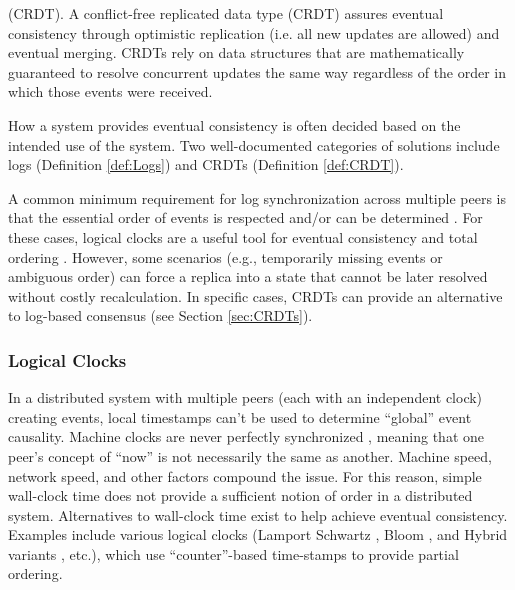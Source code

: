 \documentclass{textile}
\begin{document}
\begin{definition}
  (CRDT). A conflict-free replicated data type (CRDT) assures eventual consistency through optimistic replication (i.e. all new updates are allowed) and eventual merging. CRDTs rely on data structures that are mathematically guaranteed to resolve concurrent updates the same way regardless of the order in which those events were received.
\end{definition} \label{def:CRDT}

How a system provides eventual consistency is often decided based on the intended use of the system. Two well-documented categories of solutions include logs (Definition  \ref{def:Logs}) and CRDTs (Definition  \ref{def:CRDT}).

A common minimum requirement for log synchronization across multiple peers is that the essential order of events is respected and/or can be determined \cite{schwarzDetectingCausalRelationships1994,katzInterleavingSetTemporal1990}. For these cases, logical clocks are a useful tool for eventual consistency and total ordering \cite{kulkarniLogicalPhysicalClocks2014}. However, some scenarios (e.g., temporarily missing events or ambiguous order) can force a replica into a state that cannot be later resolved without costly recalculation. In specific cases, CRDTs can provide an alternative to log-based consensus (see Section \ref{sec:CRDTs}). 

\subsubsection{Logical Clocks}\label{sec:LogicalClocks}

In a distributed system with multiple peers (each with an independent clock) creating events, local timestamps can't be used to determine ``global'' event causality. Machine clocks are never perfectly synchronized \cite{lamportTimeClocksOrdering1978}, meaning that one peer's concept of ``now'' is not necessarily the same as another. Machine speed, network speed, and other factors compound the issue. For this reason, simple wall-clock time does not provide a sufficient notion of order in a distributed system. Alternatives to wall-clock time exist to help achieve eventual consistency. Examples include various logical clocks (Lamport \cite{lamportTimeClocksOrdering1978} Schwartz \cite{schwarzDetectingCausalRelationships1994}, Bloom \cite{ramabajaBloomClock2019}, and Hybrid variants \cite{kulkarniLogicalPhysicalClocks2014}, etc.), which use ``counter''-based time-stamps to provide partial ordering. 
\end{document}
